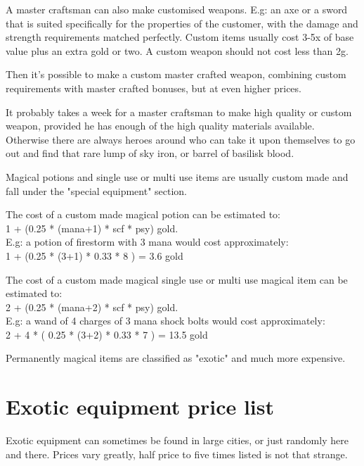 A master craftsman can also make customised weapons. E.g: an axe or a sword that is suited specifically for the properties of the customer, with the damage and strength requirements matched perfectly. Custom items usually cost 3-5x of base value plus an extra gold or two. A custom weapon should not cost less than 2g.

Then it's possible to make a custom master crafted weapon, combining custom requirements with master crafted bonuses, but at even higher prices.

It probably takes a week for a master craftsman to make high quality or custom weapon, provided he has enough of the high quality materials available. Otherwise there are always heroes around who can take it upon themselves to go out and find that rare lump of sky iron, or barrel of basilisk blood.

Magical potions and single use or multi use items are usually custom made and fall under the "special equipment" section.

The cost of a custom made magical potion can be estimated to:\\
1 + (0.25 * (mana+1) * scf * psy) gold. \\
E.g: a potion of firestorm with 3 mana would cost approximately:\\
1 + (0.25 * (3+1) * 0.33 * 8 ) = 3.6 gold

The cost of a custom made magical single use or multi use magical item can be estimated to: \\
2 + (0.25 * (mana+2) * scf * psy) gold. \\
E.g: a wand of 4 charges of 3 mana shock bolts would cost approximately: \\
2 + 4 * ( 0.25 * (3+2) * 0.33 * 7 ) = 13.5 gold

Permanently magical items are classified as "exotic" and much more expensive.





\pagebreak[1]
\section*{Exotic equipment price list}

Exotic equipment can sometimes be found in large cities, or just randomly here and there. Prices vary greatly, half price to five times listed is not that strange.

